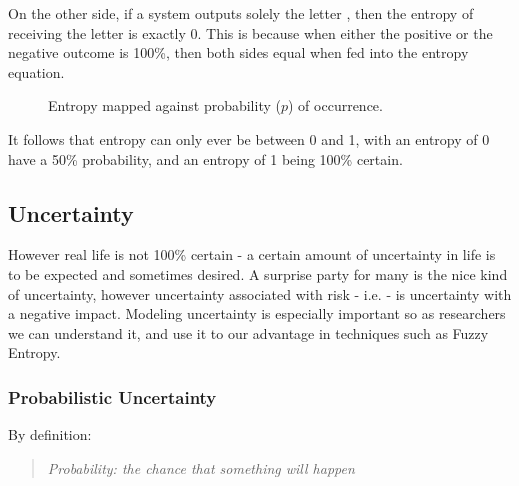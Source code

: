 On the other side, if a system outputs solely the letter , then the entropy of receiving the letter  is exactly 0. This is because when either the positive or the negative outcome is 100\%, then both sides equal  when fed into the entropy equation.
\begin{figure}[H]
\begin{center}
\end{center}
\caption{Entropy mapped against probability ($p$) of occurrence.}
\label{fig:entropy}
\end{figure}

It follows that entropy can only ever be between 0 and 1, with an entropy of 0 have a 50\% probability, and an entropy of 1 being 100\% certain.

\subsection{Uncertainty}

However real life is not 100\% certain - a certain amount of uncertainty in life is to be expected and sometimes desired. A surprise party for many is the nice kind of uncertainty, however uncertainty associated with risk - i.e.  - is uncertainty with a negative impact. Modeling uncertainty is especially important so as researchers we can understand it, and use it to our advantage in techniques such as Fuzzy Entropy.

\subsubsection{Probabilistic Uncertainty}

By definition:

\begin{quotation}
  \textit{Probability: the chance that something will happen \cite{PROBABILITY}}
\end{quotation}

